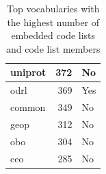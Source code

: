 \begin{table}[h]
\begin{tabular}{|l|r|l|}
uniprot        & 372  & No  \\ \hline
odrl           & 369  & Yes \\ \hline
common         & 349  & No  \\ \hline
geop           & 312  & No  \\ \hline
obo            & 304  & No  \\ \hline
ceo            & 285  & No  \\ \hline
\end{tabular}
\centering
\caption{Top vocabularies with the highest number of embedded code lists and code list members} %
\label{tab:top-codes} 
\end{table}

